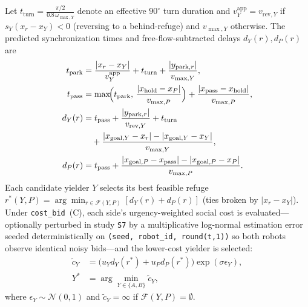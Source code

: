 \documentclass[letterpaper,journal]{IEEEtran}
\newcommand{\cb}{\texttt{cost\_bid}}
\begin{document}
Let $t_{\mathrm{turn}} = \frac{\pi/2}{0.8\,\omega_{\max,Y}}$ denote an effective $90^\circ$ turn duration and $v_Y^{\mathrm{app}} = v_{\mathrm{rev},Y}$ if $s_Y(x_r-x_Y)<0$ (reversing to a behind-refuge) and $v_{\max,Y}$ otherwise. The predicted synchronization times and free-flow-subtracted delays $d_Y(r), d_P(r)$ are
\begin{equation}
\begin{aligned}
t_{\mathrm{park}} &= \frac{|x_r - x_Y|}{v_Y^{\mathrm{app}}} + t_{\mathrm{turn}} + \frac{|y_{\mathrm{park},r}|}{v_{\max,Y}}, \\
t_{\mathrm{pass}} &= \max\!\Bigl(t_{\mathrm{park}},\, \frac{|x_{\mathrm{hold}} - x_P|}{v_{\max,P}}\Bigr) + \frac{|x_{\mathrm{pass}} - x_{\mathrm{hold}}|}{v_{\max,P}}, \\
d_Y(r) &= t_{\mathrm{pass}} + \frac{|y_{\mathrm{park},r}|}{v_{\mathrm{rev},Y}} + t_{\mathrm{turn}} \\
&\quad + \frac{|x_{\mathrm{goal},Y} - x_r| - |x_{\mathrm{goal},Y} - x_Y|}{v_{\max,Y}}, \\
d_P(r) &= t_{\mathrm{pass}} + \frac{|x_{\mathrm{goal},P} - x_{\mathrm{pass}}| - |x_{\mathrm{goal},P} - x_P|}{v_{\max,P}}.
\end{aligned}
\label{eq:timeline}
\end{equation}
Each candidate yielder $Y$ selects its best feasible refuge $r^\ast(Y,P)=\arg\min_{r\in\mathcal{F}(Y,P)}[d_Y(r)+d_P(r)]$ (ties broken by $|x_r-x_Y|$). Under \cb\ (C), each side's urgency-weighted social cost is evaluated---optionally perturbed in study \texttt{S7} by a multiplicative log-normal estimation error seeded deterministically on \texttt{(seed, robot\_id, round(t,1))} so both robots observe identical noisy bids---and the lower-cost yielder is selected:
\begin{equation}
\begin{aligned}
\tilde{c}_Y &= \bigl(u_Y d_Y(r^\ast) + u_P d_P(r^\ast)\bigr)\exp(\sigma \epsilon_Y), \\
Y^\ast &= \arg\min_{Y\in\{A,B\}} \tilde{c}_Y,
\end{aligned}
\label{eq:costbid}
\end{equation}
where $\epsilon_Y\sim\mathcal{N}(0,1)$ and $\tilde{c}_Y=\infty$ if $\mathcal{F}(Y,P)=\emptyset$.
\end{document}
